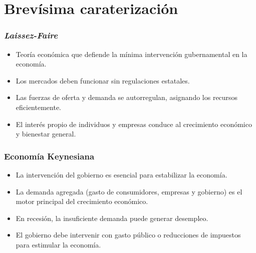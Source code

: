 \documentclass{beamer}
\begin{document}
\section{Brevísima caraterización}



\begin{frame}
\frametitle{\emph{Laissez-Faire}}
\begin{itemize}
\pause
    \item Teoría económica que defiende la mínima intervención gubernamental en la economía.
    \pause
    \item Los mercados deben funcionar sin regulaciones estatales.
    \pause
    \item Las fuerzas de oferta y demanda se autorregulan, asignando los recursos eficientemente.
    \pause
    \item El interés propio de individuos y empresas conduce al crecimiento económico y bienestar general.
\end{itemize}
\end{frame}


\begin{frame}
\frametitle{Economía Keynesiana}
\begin{itemize}
    \pause
    \item La intervención del gobierno es esencial para estabilizar la economía.
    \pause
    \item La demanda agregada (gasto de consumidores, empresas y gobierno) es el motor principal del crecimiento económico.
    \pause
    \item En recesión, la insuficiente demanda puede generar desempleo.
    \pause
    \item El gobierno debe intervenir con gasto público o reducciones de impuestos para estimular la economía.
\end{itemize}
\end{frame}
\end{document}
